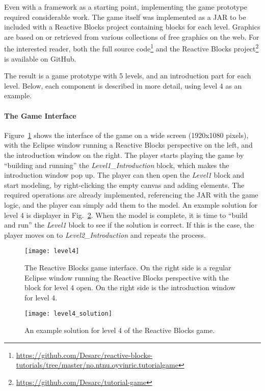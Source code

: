 \noindent
Even with a framework as a starting point, implementing the game prototype required considerable work. The game itself was implemented as a JAR to be included with a Reactive Blocks project containing blocks for each level. Graphics are based on or retrieved from various collections of free graphics on the web. For the interested reader, both the full source code\footnote{\url{https://github.com/Desarc/reactive-blocks-tutorials/tree/master/no.ntnu.oyvinric.tutorialgame}} and the Reactive Blocks project\footnote{\url{https://github.com/Desarc/tutorial-game}} is available on GitHub.

\noindent
The result is a game prototype with 5 levels, and an introduction part for each level. Below, each component is described in more detail, using level 4 as an example.

\paragraph{The Game Interface}
Figure~\ref{fig:level4} shows the interface of the game on a wide screen (1920x1080 pixels), with the Eclipse window running a Reactive Blocks perspective on the left, and the introduction window on the right. The player starts playing the game by ``building and running'' the \emph{Level1\_Introduction} block, which makes the introduction window pop up. The player can then open the \emph{Level1} block and start modeling, by right-clicking the empty canvas and adding elements. The required operations are already implemented, referencing the JAR with the game logic, and the player can simply add them to the model. An example solution for level 4 is displayer in Fig.~\ref{fig:level4_solution}. When the model is complete, it is time to ``build and run'' the \emph{Level1} block to see if the solution is correct. If this is the case, the player moves on to \emph{Level2\_Introduction} and repeats the process.

\begin{figure}[htp]
	\centering
	\texttt{[image: level4]}
	\caption[The Reactive Blocks game interface]{The Reactive Blocks game interface. On the right side is a regular Eclipse window running the Reactive Blocks perspective with the block for level 4 open. On the right side is the introduction window for level 4.}
	\label{fig:level4}
\end{figure}

\begin{figure}[htp]
	\centering
	\texttt{[image: level4\_solution]}
	\caption[Level 4 solution]{An example solution for level 4 of the Reactive Blocks game.}
	\label{fig:level4_solution}
\end{figure}

